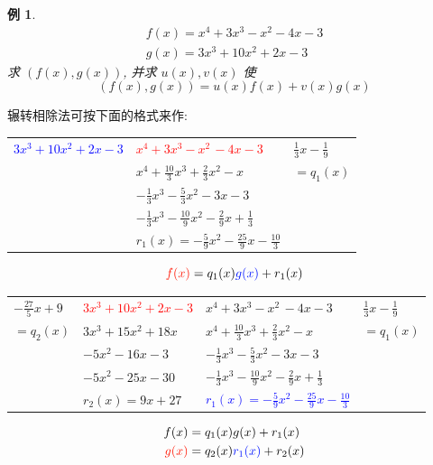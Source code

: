\documentclass[13pt,fontset=mac]{ctexbeamer}
\newtheorem{exa}{例}
\newcommand{\blue}{\textcolor{blue}}
\newcommand{\red}{\textcolor{red}}
\begin{document}
\begin{frame}
	\begin{exa}
$$
\begin{array}{l}
	f(x)=x^{4}+3 x^{3}-x^{2}-4 x-3 \\
	g(x)=3 x^{3}+10 x^{2}+2 x-3
\end{array}
$$
求 $(f(x), g(x))$, 并求 $u(x), v(x)$ 使
$$
(f(x), g(x))=u(x) f(x)+v(x) g(x)
$$
	\end{exa}
\end{frame}


\begin{frame}
辗转相除法可按下面的格式来作:
	\begin{center}
		\renewcommand\arraystretch{1.3}
		\begin{tabular}{R{3cm} |R{4cm}|L{1.5cm}}
			\blue{$3x^3+10x^2+2x-3$}&\red{$x^4+3x^3-x^2\, -4x-3$}&$\frac{1}{3}x-\frac{1}{9}$\\
			& $x^4+\frac{10}{3}x^3+\frac{2}{3}x^2-x\qquad $& $=q_1(x)$\\
			& $-\frac{1}{3}x^3-\frac{5}{3}x^2-3x-3\, $ & \\
			& $-\frac{1}{3}x^3-\frac{10}{9}x^2-\frac{2}{9}x+\frac{1}{3}$ & \\
			& $r_1(x)= -\frac{5}{9}x^2-\frac{25}{9}x-\frac{10}{3}$ &
		\end{tabular}
	\end{center}




	\[
	\red{f(x)}=q_1(x) \blue{g(x)} +r_1(x)
	\]
\end{frame}




\begin{frame}
	\begin{center}
				\renewcommand\arraystretch{1.3}
		\begin{tabular}{R{1.5cm}|R{3cm} |R{4cm}|L{1.7cm}}
$-\frac{27}{5}x+9$ &\red{$3x^3+10x^2+2x-3$}&{$x^4+3x^3-x^2\, -4x-3$}&$\frac{1}{3}x-\frac{1}{9}$\\
$=q_2(x)$ & $3x^3+15x^2+18x\quad $ & $x^4+\frac{10}{3}x^3+\frac{2}{3}x^2-x\qquad $& $=q_1(x)$\\
 &$ -5x^2-16x-3$ & $-\frac{1}{3}x^3-\frac{5}{3}x^2-3x-3\, $ & \\
  &$ -5x^2-25x-30$ & $-\frac{1}{3}x^3-\frac{10}{9}x^2-\frac{2}{9}x+\frac{1}{3}$ & \\
  &$ r_2(x) = 9x+27$ & \blue{$r_1(x) =-\frac{5}{9}x^2-\frac{25}{9}x-\frac{10}{3}$} &
		\end{tabular}
	\end{center}
	\pause

\begin{align*}
	{f(x)} & =q_1(x) {g(x)} +r_1(x)\\
\red{g(x)} & =q_2(x) \blue{r_1(x)} +r_2(x)
\end{align*}

\end{frame}
\end{document}
